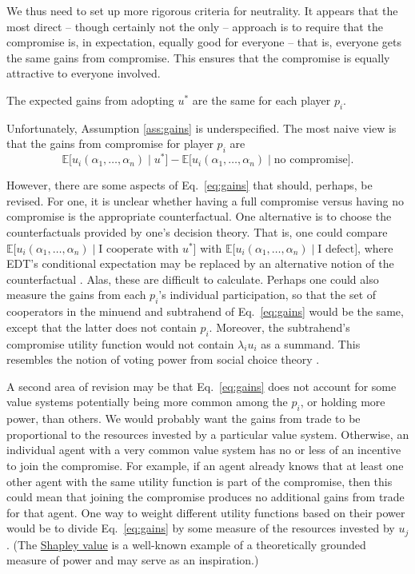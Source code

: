 We thus need to set up more rigorous criteria for neutrality. It appears
that the most direct -- though certainly not the only -- approach is to
require that the compromise is, in expectation, equally good for
everyone -- that is, everyone gets the same gains from compromise. This
ensures that the compromise is equally attractive to everyone involved.

\begin{assumption}
\label{ass:gains}
The expected gains from adopting \(u^{*}\) are the same for each player \(p_{i}\).
\end{assumption}

Unfortunately, Assumption \ref{ass:gains} is underspecified. The most naive view is that the gains
from compromise for player \(p_{i}\) are
\begin{equation}
\mathbb{E}\lbrack u_{i}(\alpha_{1},\dotsc,\alpha_{n})\mid u^{*}\rbrack - \mathbb{E}\lbrack
u_{i}(\alpha_{1},\dotsc,\alpha_{n})\mid \text{no compromise}\rbrack.
    \label{eq:gains}
\end{equation}

However, there are some aspects of Eq.~\eqref{eq:gains} that should, perhaps, be revised.
For one, it is unclear whether having a full compromise versus having no
compromise is the appropriate counterfactual. One alternative is to
choose the counterfactuals provided by one's decision theory. That is,
one could compare
\(\mathbb{E}\lbrack u_{i}(\alpha_{1},\dotsc,\alpha_{n})\mid \text{I cooperate with }u^{*}\rbrack\)
with \(\mathbb{E}\lbrack u_{i}(\alpha_{1},\dotsc,\alpha_{n})\mid \text{I defect}\rbrack\),
where EDT's conditional expectation may be replaced by an alternative
notion of the counterfactual
\parencite{Gibbard1978-nw,Hintze2014-ha}. Alas, these are
difficult to calculate. Perhaps one could also measure the gains from
each \(p_i\)'s individual participation, so that the set of
cooperators in the minuend and subtrahend of Eq.~\eqref{eq:gains} would be the same,
except that the latter does not contain \(p_{i}\). Moreover, the
subtrahend's compromise utility function would not contain
\(\lambda_{i}u_{i}\) as a summand. This resembles the notion of voting
power from social choice theory
\parencite{Cotton-Barratt2013-ql,Felsenthal1998-zv}.

A second area of revision may be that Eq.~\eqref{eq:gains} does not account for some
value systems potentially being more common among the \(p_{i}\), or
holding more power, than others. We would probably want the gains from
trade to be proportional to the resources invested by a particular value
system. Otherwise, an individual agent with a very common value system
has no or less of an incentive to join the compromise. For example, if
an agent already knows that at least one other agent with the same
utility function is part of the compromise, then this could mean that
joining the compromise produces no additional gains from trade for that
agent. One way to weight different utility functions based on their
power would be to divide Eq.~\eqref{eq:gains} by some measure of the resources invested
by \(u_{j}\). (The
\href{https://en.wikipedia.org/wiki/Shapley_value}{Shapley value}
is a well-known example of a theoretically grounded measure of power and
may serve as an inspiration.)

